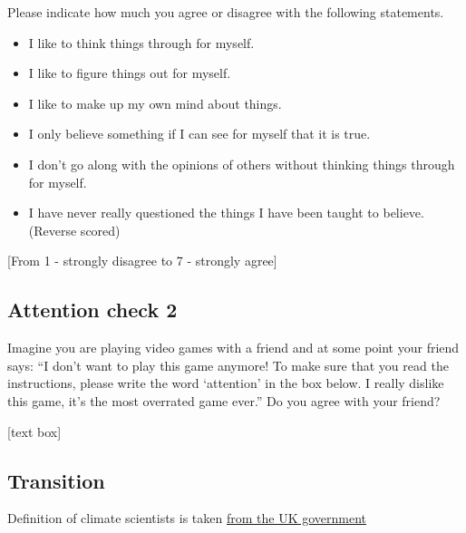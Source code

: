 \documentclass[
  letterpaper,
  DIV=11,
  numbers=noendperiod]{scrartcl}
\providecommand{\tightlist}{%
  \setlength{\itemsep}{0pt}\setlength{\parskip}{0pt}}
\begin{document}
Please indicate how much you agree or disagree with the following
statements.

\begin{itemize}
\tightlist
\item
  I like to think things through for myself.
\item
  I like to figure things out for myself.
\item
  I like to make up my own mind about things.
\item
  I only believe something if I can see for myself that it is true.
\item
  I don't go along with the opinions of others without thinking things
  through for myself.
\item
  I have never really questioned the things I have been taught to
  believe. (Reverse scored)
\end{itemize}

{[}From 1 - strongly disagree to 7 - strongly agree{]}

\subsection{Attention check 2}\label{attention-check-2}

Imagine you are playing video games with a friend and at some point your
friend says: ``I don't want to play this game anymore! To make sure that
you read the instructions, please write the word `attention' in the box
below. I really dislike this game, it's the most overrated game ever.''
Do you agree with your friend?

{[}text box{]}

\subsection{Transition}\label{transition}

\begin{tcolorbox}[enhanced jigsaw, toprule=.15mm, toptitle=1mm, colframe=quarto-callout-note-color-frame, leftrule=.75mm, rightrule=.15mm, bottomtitle=1mm, coltitle=black, colbacktitle=quarto-callout-note-color!10!white, bottomrule=.15mm, breakable, opacityback=0, titlerule=0mm, title=\textcolor{quarto-callout-note-color}{\faInfo}\hspace{0.5em}{Note}, left=2mm, arc=.35mm, opacitybacktitle=0.6, colback=white]

Definition of climate scientists is taken
\href{https://nationalcareers.service.gov.uk/job-profiles/climate-scientist}{from
the UK government}

\end{tcolorbox}
\end{document}
